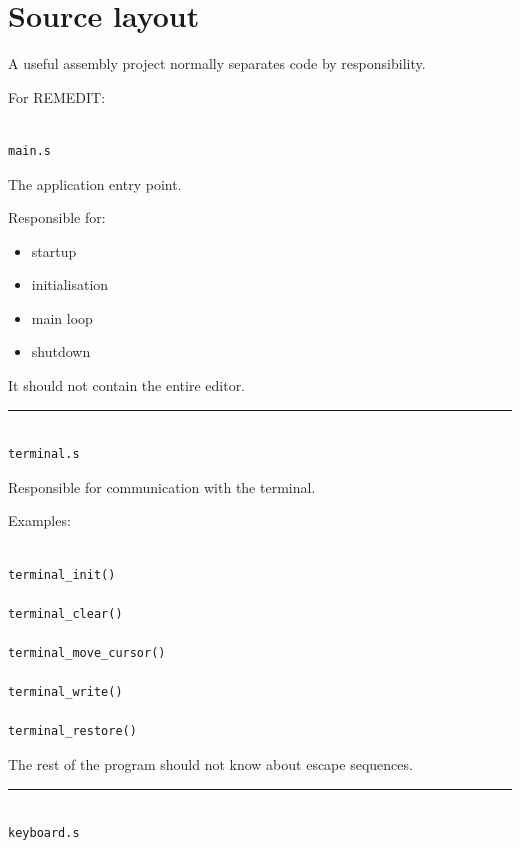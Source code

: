 \documentclass[
  oneside,
  openany]{book}
\providecommand{\tightlist}{%
  \setlength{\itemsep}{0pt}\setlength{\parskip}{0pt}}
\begin{document}
\hypertarget{source-layout}{%
\section{Source layout}\label{source-layout}}

A useful assembly project normally separates code by responsibility.

For REMEDIT:

\begin{verbatim}

main.s
\end{verbatim}

The application entry point.

Responsible for:

\begin{itemize}
\tightlist
\item
  startup
\item
  initialisation
\item
  main loop
\item
  shutdown
\end{itemize}

It should not contain the entire editor.

\begin{center}\rule{0.5\linewidth}{0.5pt}\end{center}

\begin{verbatim}

terminal.s
\end{verbatim}

Responsible for communication with the terminal.

Examples:

\begin{verbatim}

terminal_init()

terminal_clear()

terminal_move_cursor()

terminal_write()

terminal_restore()
\end{verbatim}

The rest of the program should not know about escape sequences.

\begin{center}\rule{0.5\linewidth}{0.5pt}\end{center}

\begin{verbatim}

keyboard.s
\end{verbatim}
\end{document}
